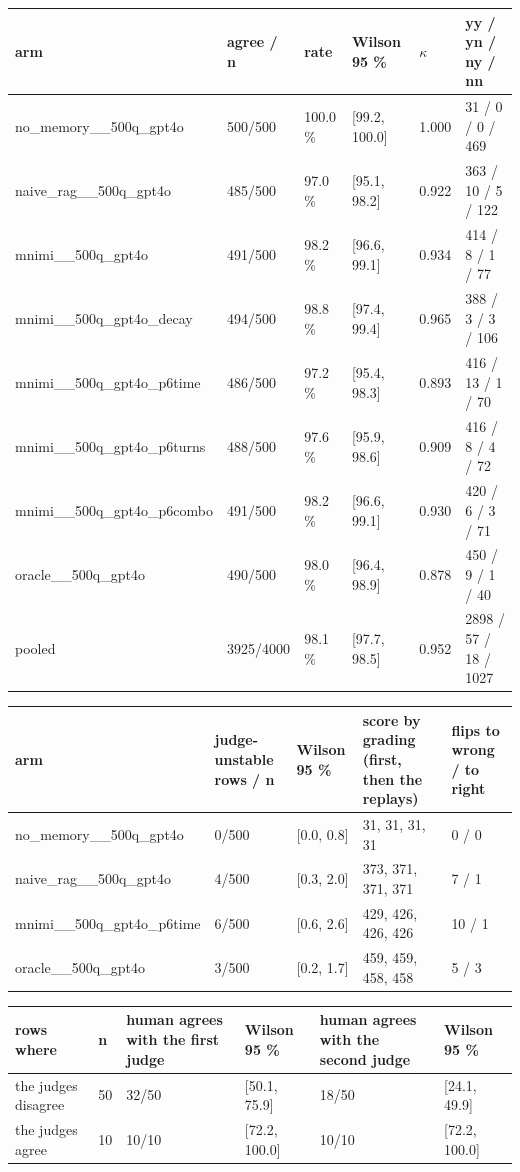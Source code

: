 \begin{tabular}{llllll}
\toprule
arm & agree / n & rate & Wilson 95 \% & $\kappa$ & yy / yn / ny / nn \\
\midrule
no\_memory\_\_500q\_gpt4o & 500/500 & 100.0 \% & [99.2, 100.0] & 1.000 & 31 / 0 / 0 / 469 \\
naive\_rag\_\_500q\_gpt4o & 485/500 & 97.0 \% & [95.1, 98.2] & 0.922 & 363 / 10 / 5 / 122 \\
mnimi\_\_500q\_gpt4o & 491/500 & 98.2 \% & [96.6, 99.1] & 0.934 & 414 / 8 / 1 / 77 \\
mnimi\_\_500q\_gpt4o\_decay & 494/500 & 98.8 \% & [97.4, 99.4] & 0.965 & 388 / 3 / 3 / 106 \\
mnimi\_\_500q\_gpt4o\_p6time & 486/500 & 97.2 \% & [95.4, 98.3] & 0.893 & 416 / 13 / 1 / 70 \\
mnimi\_\_500q\_gpt4o\_p6turns & 488/500 & 97.6 \% & [95.9, 98.6] & 0.909 & 416 / 8 / 4 / 72 \\
mnimi\_\_500q\_gpt4o\_p6combo & 491/500 & 98.2 \% & [96.6, 99.1] & 0.930 & 420 / 6 / 3 / 71 \\
oracle\_\_500q\_gpt4o & 490/500 & 98.0 \% & [96.4, 98.9] & 0.878 & 450 / 9 / 1 / 40 \\
pooled & 3925/4000 & 98.1 \% & [97.7, 98.5] & 0.952 & 2898 / 57 / 18 / 1027 \\
\bottomrule
\end{tabular}

\begin{tabular}{lllll}
\toprule
arm & judge-unstable rows / n & Wilson 95 \% & score by grading (first, then the replays) & flips to wrong / to right \\
\midrule
no\_memory\_\_500q\_gpt4o & 0/500 & [0.0, 0.8] & 31, 31, 31, 31 & 0 / 0 \\
naive\_rag\_\_500q\_gpt4o & 4/500 & [0.3, 2.0] & 373, 371, 371, 371 & 7 / 1 \\
mnimi\_\_500q\_gpt4o\_p6time & 6/500 & [0.6, 2.6] & 429, 426, 426, 426 & 10 / 1 \\
oracle\_\_500q\_gpt4o & 3/500 & [0.2, 1.7] & 459, 459, 458, 458 & 5 / 3 \\
\bottomrule
\end{tabular}

\begin{tabular}{llllll}
\toprule
rows where & n & human agrees with the first judge & Wilson 95 \% & human agrees with the second judge & Wilson 95 \% \\
\midrule
the judges disagree & 50 & 32/50 & [50.1, 75.9] & 18/50 & [24.1, 49.9] \\
the judges agree & 10 & 10/10 & [72.2, 100.0] & 10/10 & [72.2, 100.0] \\
\bottomrule
\end{tabular}

